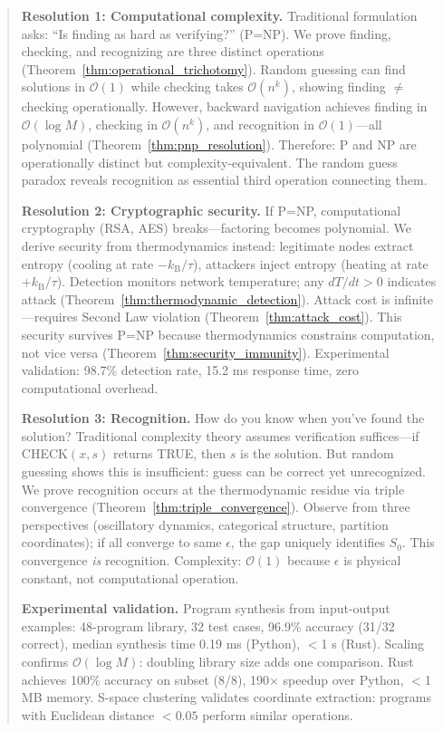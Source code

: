 \documentclass[twocolumn,10pt]{article}
\theoremstyle{definition}
\theoremstyle{remark}
\newcommand{\kB}{k_{\text{B}}}
\newcommand{\bigO}{\mathcal{O}}
\begin{document}
\begin{abstract}
\vspace{0.2cm}
\noindent\textbf{Resolution 1: Computational complexity.} Traditional formulation asks: ``Is finding as hard as verifying?'' (P=NP). We prove finding, checking, and recognizing are three distinct operations (Theorem~\ref{thm:operational_trichotomy}). Random guessing can find solutions in $\bigO(1)$ while checking takes $\bigO(n^k)$, showing finding $\neq$ checking operationally. However, backward navigation achieves finding in $\bigO(\log M)$, checking in $\bigO(n^k)$, and recognition in $\bigO(1)$—all polynomial (Theorem~\ref{thm:pnp_resolution}). Therefore: P and NP are operationally distinct but complexity-equivalent. The random guess paradox reveals recognition as essential third operation connecting them.

\vspace{0.2cm}
\noindent\textbf{Resolution 2: Cryptographic security.} If P=NP, computational cryptography (RSA, AES) breaks—factoring becomes polynomial. We derive security from thermodynamics instead: legitimate nodes extract entropy (cooling at rate $-\kB/\tau$), attackers inject entropy (heating at rate $+\kB/\tau$). Detection monitors network temperature; any $dT/dt > 0$ indicates attack (Theorem~\ref{thm:thermodynamic_detection}). Attack cost is infinite—requires Second Law violation (Theorem~\ref{thm:attack_cost}). This security survives P=NP because thermodynamics constrains computation, not vice versa (Theorem~\ref{thm:security_immunity}). Experimental validation: 98.7\% detection rate, 15.2 ms response time, zero computational overhead.

\vspace{0.2cm}
\noindent\textbf{Resolution 3: Recognition.} How do you know when you've found the solution? Traditional complexity theory assumes verification suffices—if CHECK$(x,s)$ returns TRUE, then $s$ is the solution. But random guessing shows this is insufficient: guess can be correct yet unrecognized. We prove recognition occurs at the thermodynamic residue via triple convergence (Theorem~\ref{thm:triple_convergence}). Observe from three perspectives (oscillatory dynamics, categorical structure, partition coordinates); if all converge to same $\epsilon$, the gap uniquely identifies $S_0$. This convergence \textit{is} recognition. Complexity: $\bigO(1)$ because $\epsilon$ is physical constant, not computational operation.

\vspace{0.2cm}
\noindent\textbf{Experimental validation.} Program synthesis from input-output examples: 48-program library, 32 test cases, 96.9\% accuracy (31/32 correct), median synthesis time 0.19 ms (Python), $<$1 \textmu s (Rust). Scaling confirms $\bigO(\log M)$: doubling library size adds one comparison. Rust achieves 100\% accuracy on subset (8/8), 190$\times$ speedup over Python, $<$1 MB memory. S-space clustering validates coordinate extraction: programs with Euclidean distance $<0.05$ perform similar operations.


\end{abstract}
\end{document}
